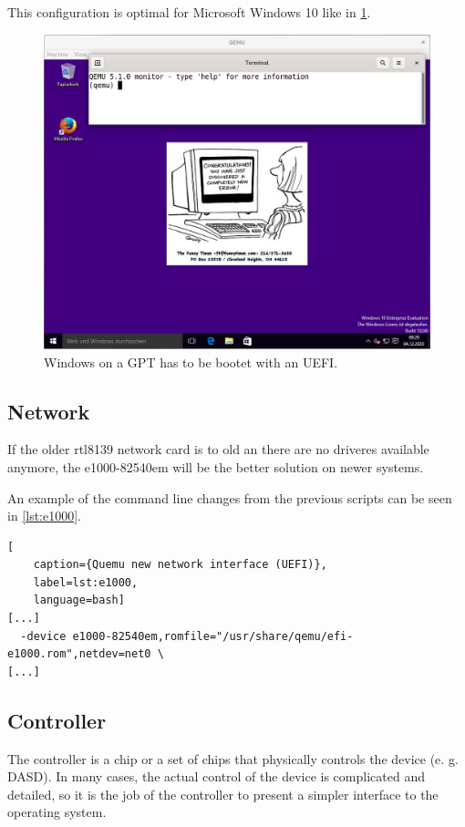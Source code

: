 \noindent This configuration is optimal for Microsoft Windows 10 like in \cref{fig:uefi}.

\begin{figure}[htbp]  %
  \centering
  \includegraphics[width=.75\textwidth]{figures/boot-uefi-win10ee-qxl.png}
  \caption[Qemu UEFI]{Windows on a GPT has to be bootet with an UEFI.}
  \label{fig:uefi}
\end{figure}

\subsection{Network}

If the older rtl8139 network card is to old an there are no driveres available anymore, the e1000-82540em will be the better solution on newer systems.

An example of the command line changes from the previous scripts can be seen in \cref{lst:e1000}.

\begin{lstlisting}[
    caption={Quemu new network interface (UEFI)},
    label=lst:e1000,
    language=bash]
[...]
  -device e1000-82540em,romfile="/usr/share/qemu/efi-e1000.rom",netdev=net0 \
[...]
\end{lstlisting}

\subsection{Controller}

The controller is a chip or a set of chips that physically controls the device (e. g. DASD). In many cases, the actual control of the device is complicated and detailed, so it is the job of the controller to present a simpler interface to the operating system. \cite{Tanenbaum2014:28}

